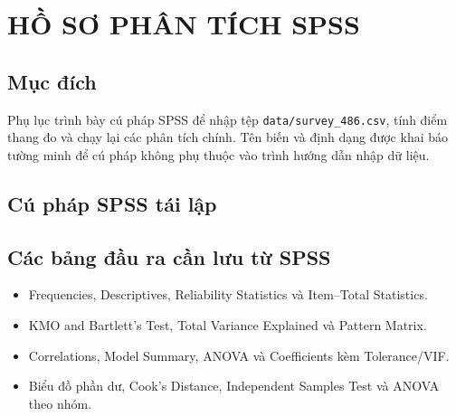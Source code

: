 \chapter{HỒ SƠ PHÂN TÍCH SPSS}
\section*{Mục đích}
Phụ lục trình bày cú pháp SPSS để nhập tệp \texttt{data/survey\_486.csv}, tính điểm thang đo và chạy lại các phân tích chính. Tên biến và định dạng được khai báo tường minh để cú pháp không phụ thuộc vào trình hướng dẫn nhập dữ liệu.

\section*{Cú pháp SPSS tái lập}

\section*{Các bảng đầu ra cần lưu từ SPSS}
\begin{itemize}[leftmargin=1.5cm]
\item Frequencies, Descriptives, Reliability Statistics và Item--Total Statistics.
\item KMO and Bartlett's Test, Total Variance Explained và Pattern Matrix.
\item Correlations, Model Summary, ANOVA và Coefficients kèm Tolerance/VIF.
\item Biểu đồ phần dư, Cook's Distance, Independent Samples Test và ANOVA theo nhóm.
\end{itemize}

